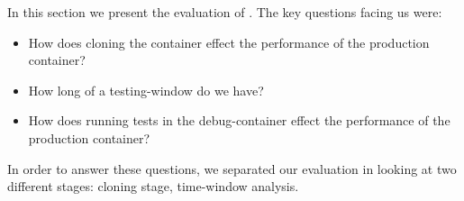  
 

\iffalse
In this section we present the evaluation of \parikshan. 
The key questions facing us were:
\begin{itemize}
   \item How does cloning the container effect the performance of the production container?
   \item How long of a testing-window do we have? 
   \item How does running tests in the debug-container effect the performance of the production container?
\end{itemize}
In order to answer these questions, we separated our evaluation in looking at two different stages: cloning stage, time-window analysis.

